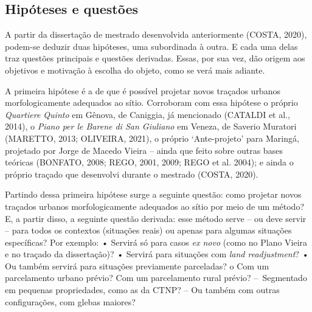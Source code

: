 \documentclass[twoside, 12pt]{book}
\begin{document}
    \subsection{Hipóteses e questões}	 

        A partir da dissertação de mestrado desenvolvida anteriormente (COSTA, 2020), podem-se deduzir duas hipóteses, uma subordinada à outra. E cada uma delas traz questões principais e questões derivadas. Essas, por sua vez, dão origem aos objetivos e motivação à escolha do objeto, como se verá mais adiante.

        A primeira hipótese é a de que é possível projetar novos traçados urbanos morfologicamente adequados ao sítio. Corroboram com essa hipótese o próprio \textit{Quartiere Quinto} em Gênova, de Caniggia, já mencionado (CATALDI et al., 2014), o \textit{Piano per le Barene di San Giuliano} em Veneza, de Saverio Muratori (MARETTO, 2013; OLIVEIRA, 2021), o próprio ‘Ante-projeto’ para Maringá, projetado por Jorge de Macedo Vieira – ainda que feito sobre outras bases teóricas (BONFATO, 2008; REGO, 2001, 2009; REGO et al. 2004); e ainda o próprio traçado que desenvolvi durante o mestrado (COSTA, 2020). 

        Partindo dessa primeira hipótese surge a seguinte questão: como projetar novos traçados urbanos morfologicamente adequados ao sítio por meio de um método? E, a partir disso, a seguinte questão derivada: esse método serve – ou deve servir – para todos os contextos (situações reais) ou apenas para algumas situações específicas? Por exemplo: 
            •	Servirá só para casos \textit{ex novo} (como no Plano Vieira e no traçado da dissertação)? 
            •	Servirá para situações com \textit{land readjustment}?
            •	Ou também servirá para situações previamente parceladas?
                o	Com um parcelamento urbano prévio?
	                Com um parcelamento rural prévio?
	                – Segmentado em pequenas propriedades, como as da CTNP?
                    – Ou também com outras configurações, com glebas maiores?
\end{document}
